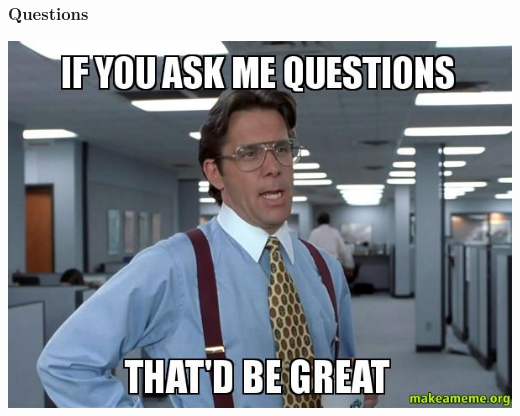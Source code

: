 \documentclass[aspectratio=169]{beamer}
\begin{document}
\begin{frame}
  \frametitle{Questions}
  \begin{center}
    \includegraphics[scale=0.3]{questions}
  \end{center}
\end{frame}
\end{document}
